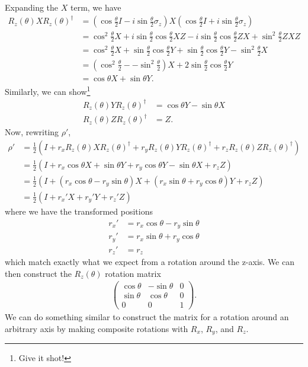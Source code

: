 \documentclass[11pt]{article} %
\begin{document}
Expanding the $X$ term, we have
\begin{align}
    R_z(\theta)X R_z(\theta)^\dagger &= \left(\cos\frac{\theta}{2}I-i\sin\frac{\theta}{2}\sigma_z\right)X\left(\cos\frac{\theta}{2}I+i\sin\frac{\theta}{2}\sigma_z\right)\\
    &= \cos^2\frac{\theta}{2}X + i\sin\frac{\theta}{2}\cos\frac{\theta}{2}XZ - i\sin\frac{\theta}{2}\cos\frac{\theta}{2}ZX+\sin^2\frac{\theta}{2}ZXZ\\
    &= \cos^2\frac{\theta}{2}X + \sin\frac{\theta}{2}\cos\frac{\theta}{2}Y + \sin\frac{\theta}{2}\cos\frac{\theta}{2}Y - \sin^2\frac{\theta}{2}X\\
    &= \left(\cos^2\frac{\theta}{2}-- \sin^2\frac{\theta}{2}\right)X + 2\sin\frac{\theta}{2}\cos\frac{\theta}{2}Y\nonumber\\
    &= \cos\theta X + \sin\theta Y.
\end{align}
Similarly, we can show\footnote{Give it shot!}
\begin{align}
    R_z(\theta)Y R_z(\theta)^\dagger &= \cos\theta Y - \sin\theta X\\
    R_z(\theta)Z R_z(\theta)^\dagger &= Z.
\end{align}
Now, rewriting $\rho'$,
\begin{align}
    \rho' &= \frac{1}{2}\left(I+r_x R_z(\theta)X R_z(\theta)^\dagger +r_y R_z(\theta)Y R_z(\theta)^\dagger + r_z R_z(\theta)Z R_z(\theta)^\dagger\right)\nonumber\\
    &= \frac{1}{2}\left(I+r_x \cos\theta X + \sin\theta Y +r_y \cos\theta Y - \sin\theta X + r_z Z\right)\nonumber\\
    &= \frac{1}{2}\left(I+(r_x\cos\theta-r_y\sin\theta)X + (r_x\sin\theta+r_y\cos\theta)Y + r_z Z\right)\\
    &= \frac{1}{2}\left(I+r_x'X + r_y'Y+r_z'Z\right)
\end{align}
where we have the transformed positions
\begin{align}
    r_x' &= r_x\cos\theta-r_y\sin\theta\nonumber\\
    r_y' &= r_x\sin\theta+r_y\cos\theta\nonumber\\
    r_z' &= r_z
\end{align}
which match exactly what we expect from a rotation around the z-axis. We can then construct the $R_z(\theta)$ rotation matrix
\begin{align}
    \begin{pmatrix}
        \cos\theta & -\sin\theta & 0\\
        \sin\theta & \cos\theta & 0\\
        0 & 0 & 1
    \end{pmatrix}.
\end{align}
We can do something similar to construct the matrix for a rotation around an arbitrary axis by making composite rotations with $R_x$, $R_y$, and $R_z$.
\end{document}
